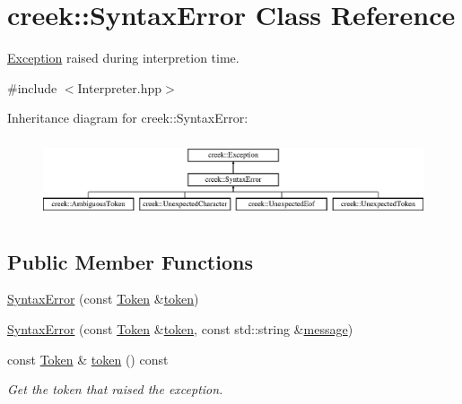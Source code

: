 \hypertarget{classcreek_1_1_syntax_error}{}\section{creek\+:\+:Syntax\+Error Class Reference}
\label{classcreek_1_1_syntax_error}


\hyperlink{classcreek_1_1_exception}{Exception} raised during interpretion time.  




{\ttfamily \#include $<$Interpreter.\+hpp$>$}

Inheritance diagram for creek\+:\+:Syntax\+Error\+:\begin{figure}[H]
\begin{center}
\leavevmode
\includegraphics[height=2.320442cm]{classcreek_1_1_syntax_error}
\end{center}
\end{figure}
\subsection*{Public Member Functions}
\begin{DoxyCompactItemize}
\item 
\hyperlink{classcreek_1_1_syntax_error_afbbf3398383bca06a2828172ac1b2c5d}{Syntax\+Error} (const \hyperlink{classcreek_1_1_token}{Token} \&\hyperlink{classcreek_1_1_syntax_error_a5d8f72f338fd320cb76f9e1a875e2a35}{token})
\item 
\hyperlink{classcreek_1_1_syntax_error_ab4a526421f55deebddc5a31874f5ba24}{Syntax\+Error} (const \hyperlink{classcreek_1_1_token}{Token} \&\hyperlink{classcreek_1_1_syntax_error_a5d8f72f338fd320cb76f9e1a875e2a35}{token}, const std\+::string \&\hyperlink{classcreek_1_1_exception_a1c6434cdf4b8643c77ee35d9d88a1427}{message})
\item 
const \hyperlink{classcreek_1_1_token}{Token} \& \hyperlink{classcreek_1_1_syntax_error_a5d8f72f338fd320cb76f9e1a875e2a35}{token} () const \hypertarget{classcreek_1_1_syntax_error_a5d8f72f338fd320cb76f9e1a875e2a35}{}\label{classcreek_1_1_syntax_error_a5d8f72f338fd320cb76f9e1a875e2a35}

\begin{DoxyCompactList}\small\item\em Get the token that raised the exception. \end{DoxyCompactList}\end{DoxyCompactItemize}
